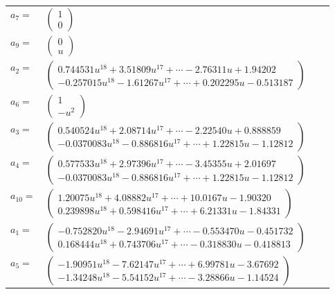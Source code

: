 \documentclass[1p]{elsarticle_modified}
\theoremstyle{definition}
\begin{document}
\begin{tabular}{m{7pt} m{180pt} m{7pt} m{180pt} }
\flushright $a_{7}=$&$\begin{pmatrix}1\\0\end{pmatrix}$ \\
\flushright $a_{9}=$&$\begin{pmatrix}0\\u\end{pmatrix}$ \\
\flushright $a_{2}=$&$\begin{pmatrix}0.744531 u^{18}+3.51809 u^{17}+\cdots-2.76311 u+1.94202\\-0.257015 u^{18}-1.61267 u^{17}+\cdots+0.202295 u-0.513187\end{pmatrix}$ \\
\flushright $a_{6}=$&$\begin{pmatrix}1\\- u^2\end{pmatrix}$ \\
\flushright $a_{3}=$&$\begin{pmatrix}0.540524 u^{18}+2.08714 u^{17}+\cdots-2.22540 u+0.888859\\-0.0370083 u^{18}-0.886816 u^{17}+\cdots+1.22815 u-1.12812\end{pmatrix}$ \\
\flushright $a_{4}=$&$\begin{pmatrix}0.577533 u^{18}+2.97396 u^{17}+\cdots-3.45355 u+2.01697\\-0.0370083 u^{18}-0.886816 u^{17}+\cdots+1.22815 u-1.12812\end{pmatrix}$ \\
\flushright $a_{10}=$&$\begin{pmatrix}1.20075 u^{18}+4.08882 u^{17}+\cdots+10.0167 u-1.90320\\0.239898 u^{18}+0.598416 u^{17}+\cdots+6.21331 u-1.84331\end{pmatrix}$ \\
\flushright $a_{1}=$&$\begin{pmatrix}-0.752820 u^{18}-2.94691 u^{17}+\cdots-0.553470 u-0.451732\\0.168444 u^{18}+0.743706 u^{17}+\cdots-0.318830 u-0.418813\end{pmatrix}$ \\
\flushright $a_{5}=$&$\begin{pmatrix}-1.90951 u^{18}-7.62147 u^{17}+\cdots+6.99781 u-3.67692\\-1.34248 u^{18}-5.54152 u^{17}+\cdots-3.28866 u-1.14524\end{pmatrix}$ \\

\end{tabular}
\end{document}

